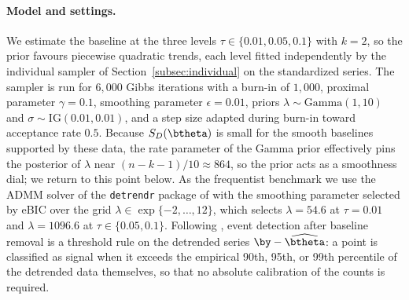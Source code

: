 \paragraph{Model and settings.} We estimate the baseline at the three levels $\tau \in \{0.01, 0.05, 0.1\}$ with $k = 2$, so the prior favours piecewise quadratic trends, each level fitted independently by the individual sampler of Section~\ref{subsec:individual} on the standardized series. The sampler is run for $6{,}000$ Gibbs iterations with a burn-in of $1{,}000$, proximal parameter $\gamma = 0.1$, smoothing parameter $\epsilon = 0.01$, priors $\lambda \sim \mathrm{Gamma}(1, 10)$ and $\sigma \sim \mathrm{IG}(0.01, 0.01)$, and a step size adapted during burn-in toward acceptance rate $0.5$. Because $S_{D}(\btheta)$ is small for the smooth baselines supported by these data, the rate parameter of the Gamma prior effectively pins the posterior of $\lambda$ near $(n - k - 1)/10 \approx 864$, so the prior acts as a smoothness dial; we return to this point below. As the frequentist benchmark we use the ADMM solver of the \texttt{detrendr} package of \citet{brantley2020baseline} with the smoothing parameter selected by eBIC over the grid $\lambda \in \exp\{-2, \dots, 12\}$, which selects $\lambda = 54.6$ at $\tau = 0.01$ and $\lambda = 1096.6$ at $\tau \in \{0.05, 0.1\}$. Following \citet{brantley2020baseline}, event detection after baseline removal is a threshold rule on the detrended series $\by - \widehat{\btheta}$: a point is classified as signal when it exceeds the empirical 90th, 95th, or 99th percentile of the detrended data themselves, so that no absolute calibration of the counts is required.

